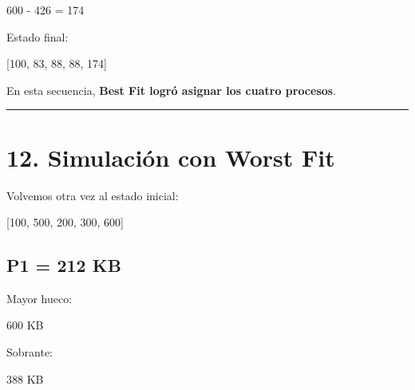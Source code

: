 \documentclass[
  spanish,
  letterpaper,
]{scrbook}
\newenvironment{Shaded}{\begin{snugshade}}{\end{snugshade}}
\newcommand{\NormalTok}[1]{\textcolor[rgb]{0.00,0.23,0.31}{#1}}
\begin{document}
\begin{Shaded}
\begin{Highlighting}[]
\NormalTok{600 {-} 426 = 174}
\end{Highlighting}
\end{Shaded}

Estado final:

\begin{Shaded}
\begin{Highlighting}[]
\NormalTok{[100, 83, 88, 88, 174]}
\end{Highlighting}
\end{Shaded}

En esta secuencia, \textbf{Best Fit logró asignar los cuatro procesos}.

\begin{center}\rule{0.5\linewidth}{0.5pt}\end{center}


\chapter{12. Simulación con Worst
Fit}\label{simulaciuxf3n-con-worst-fit}

Volvemos otra vez al estado inicial:

\begin{Shaded}
\begin{Highlighting}[]
\NormalTok{[100, 500, 200, 300, 600]}
\end{Highlighting}
\end{Shaded}

\section{P1 = 212 KB}\label{p1-212-kb-2}

Mayor hueco:

\begin{Shaded}
\begin{Highlighting}[]
\NormalTok{600 KB}
\end{Highlighting}
\end{Shaded}

Sobrante:

\begin{Shaded}
\begin{Highlighting}[]
\NormalTok{388 KB}
\end{Highlighting}
\end{Shaded}
\end{document}
